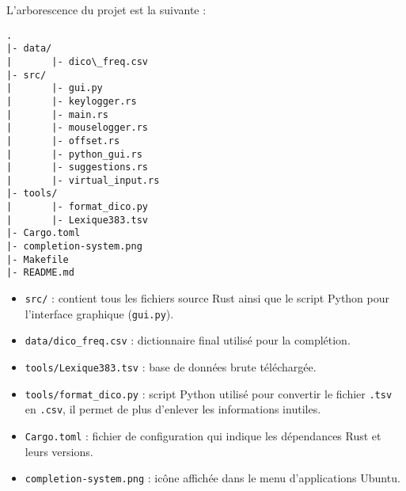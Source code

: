 L'arborescence du projet est la suivante :

\begin{lstlisting}[basicstyle=\ttfamily]
.
|- data/
|       |- dico\_freq.csv
|- src/
|       |- gui.py
|       |- keylogger.rs
|       |- main.rs
|       |- mouselogger.rs
|       |- offset.rs
|       |- python_gui.rs
|       |- suggestions.rs
|       |- virtual_input.rs
|- tools/
|       |- format_dico.py
|       |- Lexique383.tsv
|- Cargo.toml
|- completion-system.png
|- Makefile
|- README.md
\end{lstlisting}


\begin{itemize}
	\item \texttt{src/} : contient tous les fichiers source Rust ainsi que le script Python pour l'interface graphique (\texttt{gui.py}).
	\item \texttt{data/dico\_freq.csv} : dictionnaire final utilisé pour la complétion.
	\item \texttt{tools/Lexique383.tsv} : base de données brute téléchargée.
	\item \texttt{tools/format\_dico.py} : script Python utilisé pour convertir le fichier \texttt{.tsv} en \texttt{.csv}, il permet de plus d'enlever les informations inutiles.
	\item \texttt{Cargo.toml} : fichier de configuration qui indique les dépendances Rust et leurs versions.
	\item \texttt{completion-system.png} : icône affichée dans le menu d’applications Ubuntu.
\end{itemize}

% 

